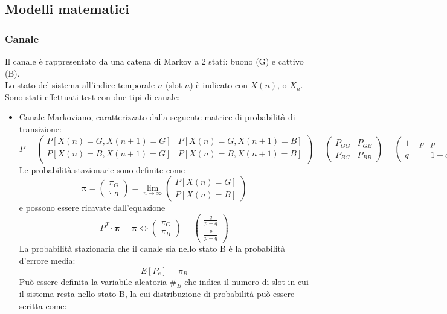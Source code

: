 \documentclass[italian, a4paper, 12pt]{article}
\begin{document}
\subsection{Modelli matematici}
\subsubsection{Canale}
\label{sec:markov}
Il canale è rappresentato da una catena di Markov a 2 stati: buono (G) e cattivo (B).\\
Lo stato del sistema all'indice temporale $n$ (slot $n$) è indicato con $X(n)$, o $X_n$.\\
Sono stati effettuati test con due tipi di canale:
\begin{itemize}
\item Canale Markoviano, caratterizzato dalla seguente matrice di probabilità di transizione:\\
$$P=\begin{pmatrix}
P[X(n)=G, X(n+1)=G] & P[X(n)=G, X(n+1)=B]\\
P[X(n)=B, X(n+1)=G] & P[X(n)=B, X(n+1)=B]\\
\end{pmatrix} = \begin{pmatrix}
P_{GG} & P_{GB} \\
P_{BG} & P_{BB}
\end{pmatrix} =
\begin{pmatrix}
1-p & p \\
q & 1-q
\end{pmatrix}$$
Le probabilità stazionarie sono definite come
$$\bm{\pi} = \begin{pmatrix}
\pi_G\\\pi_B
\end{pmatrix} = \lim_{n \to\infty} \begin{pmatrix}
P[X(n)=G]\\
P[X(n)=B]
\end{pmatrix}$$
e possono essere ricavate dall'equazione
$$P^T\cdot \bm{\pi} = \bm{\pi} \Leftrightarrow \begin{pmatrix}
\pi_G\\
\pi_B
\end{pmatrix}=
\begin{pmatrix}
\frac{q}{p+q}\\
\frac{p}{p+q}
\end{pmatrix}$$
La probabilità stazionaria che il canale sia nello stato B è la probabilità d'errore media:
$$E[P_e] = \pi_B$$
Può essere definita la variabile aleatoria $\#_B$ che indica il numero di slot in cui il sistema resta nello stato B, la cui distribuzione di probabilità può essere scritta come:

\end{itemize}
\end{document}
